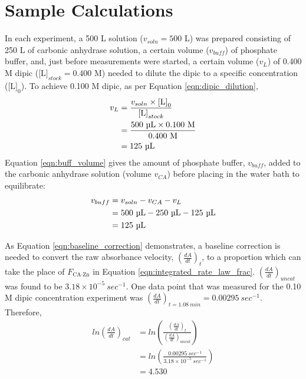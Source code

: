 \section{Sample Calculations}
In each experiment, a 500 {\textmu}L solution ($v_{soln}=500$ {\textmu}L) was prepared consisting of 250 {\textmu}L of carbonic anhydrase solution, a certain volume ($v_{buff}$) of phosphate buffer, and, just before measurements were started, a certain volume ($v_{L}$) of 0.400 M dipic ($\text{[L]}_{stock}=0.400$ M) needed to dilute the dipic to a specific concentration ($\text{[L]}_0$). To achieve 0.100 M dipic, as per Equation \eqref{eqn:dipic_dilution},
\begin{equation*}
\begin{split}
v_L&=\frac{v_{soln} \times \text{[L]}_0}{\text{[L]}_{stock}}\\
&=\frac{500\text{ {\textmu}L} \times 0.100\text{ M}}{0.400\text{ M}}\\
&=125\text{ {\textmu}L}
\end{split}
\end{equation*}
Equation \eqref{eqn:buff_volume} gives the amount of phosphate buffer, $v_{buff}$, added to the carbonic anhydrase solution (volume $v_{CA}$) before placing in the water bath to equilibrate:
\begin{equation*}
\begin{split}
v_{buff}&=v_{soln}-v_{CA}-v_L\\
&=500\text{ {\textmu}L}-250\text{ {\textmu}L}-125\text{ {\textmu}L}\\
&=125\text{ {\textmu}L}
\end{split}
\end{equation*}

As Equation \eqref{eqn:baseline_correction} demonstrates, a baseline correction is needed to convert the raw absorbance velocity, $\left(\frac{dA}{dt}\right)_{t}$, to a proportion which can take the place of $F_\text{CA$\cdot$Zn}$ in Equation \eqref{eqn:integrated_rate_law_frac}. $\left(\frac{dA}{dt}\right)_{uncat}$ was found to be $3.18\times10^{-5}\ sec^{-1}$. One data point that was measured for the 0.10 M dipic concentration experiment was $\left(\frac{dA}{dt}\right)_{t=1.08\ min}=0.00295\ sec^{-1}$. Therefore,
\begin{equation*}
\begin{split}
ln \left(\frac{dA}{dt}\right)_{cat}
&= ln \left( \frac{ \left (\frac{dA}{dt}\right)_{t} }{ \left (\frac{dA}{dt}\right)_{uncat} } \right) \\
&= ln \left( \frac{ 0.00295\ sec^{-1} }{ 3.18\times10^{-5}\ sec^{-1} } \right) \\
&= 4.530
\end{split}
\end{equation*}

